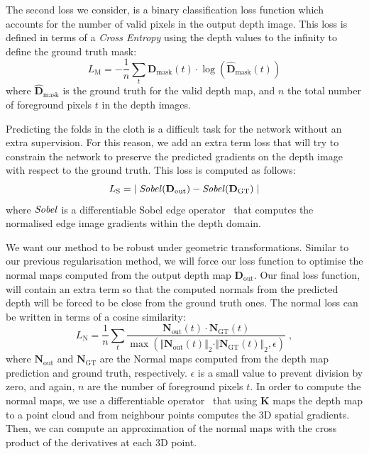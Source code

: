 \vspace{1mm}
 The second loss we consider, is a binary classification loss function which accounts for the number of valid pixels in the output depth image. This loss is defined in terms of a {\em Cross Entropy} using the depth values to the infinity to define the ground truth mask:
\begin{equation}
     L_\textrm{M} = - \frac{1}{n} \sum_{t} \mathbf{D}_{\text{mask}}(t) \cdot \log(\hat{\mathbf{D}}_{\text{mask}}(t))
\end{equation}
where $\hat{\mathbf{D}}_{\text{mask}}$ is the ground truth for the valid depth map, and $n$ the total number of foreground pixels $t$ in the depth images.

\vspace{1mm}
 Predicting the folds in the cloth is a difficult task for the network without an extra supervision. For this reason, we add an extra term loss that will try to constrain the network to preserve the predicted gradients on the depth image with respect to the ground truth. This loss is computed as follows:
\begin{equation}
    L_\textrm{S} = {\mid \text{\textit{Sobel}}(\mathbf{D}_{\textrm{out}}) - \text{\textit{Sobel}}(\mathbf{D}_{\textrm{GT}}) \mid}
\end{equation}
where $\text{\textit{Sobel}}$ is a differentiable Sobel edge operator~\cite{eriba2020kornia} that computes the normalised edge image gradients within the depth domain.

\vspace{1mm}
 We want our method to be robust under geometric transformations. Similar to our previous regularisation method, we will force our loss function to optimise the normal maps computed from the output depth map $\mathbf{D}_{\textrm{out}}$. Our final loss function, will contain an extra term so that the computed normals from the predicted depth will be forced to be close from the ground truth ones. The normal loss can be written in terms of a cosine similarity:
\begin{equation}
        L_\textrm{N} = \frac{1}{n} \sum_{t} \dfrac{\mathbf{N}_{\textrm{out}}(t) \cdot \mathbf{N}_{\textrm{GT}}(t)}{\max(\Vert \mathbf{N}_{\textrm{out}}(t) \Vert _2 \cdot \Vert \mathbf{N}_{\textrm{GT}}(t) \Vert _2, \epsilon)}\;,
\end{equation}
where $\mathbf{N}_{\textrm{out}}$ and $\mathbf{N}_{\textrm{GT}}$ are the Normal maps computed from the depth map prediction and ground truth, respectively. $\epsilon$ is a small value to prevent division by zero, and again, $n$ are the number of foreground pixels $t$. In order to compute the normal maps, we  use a differentiable operator~\cite{eriba2019kornia, eriba2020kornia} that using $\textbf{K}$ maps the depth map to a point cloud and from neighbour points computes the 3D spatial gradients. Then, we can compute an approximation of the normal maps with the cross product of the derivatives at each 3D point.

